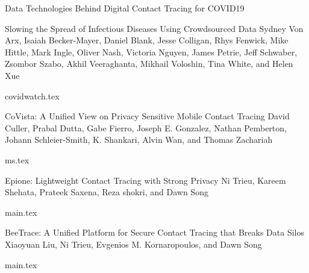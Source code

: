 \documentclass[11pt]{article}
\begin{document}
\begin{bulletin}
\begin{articlesection}{Data Technologies Behind Digital Contact Tracing for COVID19}
\makeatletter
\renewcommand{\AB@affillist}{}
\renewcommand{\AB@authlist}{}
\setcounter{authors}{0}
\makeatother

\begin{article}
{Slowing the Spread of Infectious Diseases Using Crowdsourced Data}
{Sydney Von Arx, Isaiah Becker-Mayer, Daniel Blank, Jesse Colligan, Rhys Fenwick, Mike Hittle, Mark Ingle, Oliver Nash, Victoria Nguyen, James Petrie, Jeff Schwaber, Zsombor Szabo, Akhil Veeraghanta, Mikhail Voloshin, Tina White, and Helen Xue}
\graphicspath{{submissions/covidwatch/}}
{covidwatch.tex}
\end{article}


\makeatletter
\renewcommand{\AB@affillist}{}
\renewcommand{\AB@authlist}{}
\setcounter{authors}{0}
\makeatother

\begin{article}
{CoVista: A Unified View on Privacy Sensitive Mobile Contact Tracing}
{David Culler, Prabal Dutta, Gabe Fierro, Joseph E. Gonzalez, Nathan Pemberton, Johann Schleier-Smith, K. Shankari, Alvin Wan, and Thomas Zachariah}
\graphicspath{{submissions/BerkeleyCovista/figs/}}
{ms.tex}
\end{article}


\makeatletter
\renewcommand{\AB@affillist}{}
\renewcommand{\AB@authlist}{}
\setcounter{authors}{0}
\makeatother

\begin{article}
{Epione: Lightweight  Contact Tracing with Strong Privacy}
{Ni Trieu, Kareem Shehata, Prateek Saxena, Reza shokri, and Dawn Song}
\graphicspath{{submissions/Epione/figs/}}
{main.tex}
\end{article}


\makeatletter
\renewcommand{\AB@affillist}{}
\renewcommand{\AB@authlist}{}
\setcounter{authors}{0}
\makeatother

\begin{article}
{BeeTrace: A Unified Platform for Secure Contact Tracing that Breaks Data Silos}
{Xiaoyuan Liu, Ni Trieu, Evgenios M. Kornaropoulos, and Dawn Song}
\graphicspath{{submissions/BeeTrace/figs/}}
{main.tex}
\end{article}



\end{articlesection}
\end{bulletin}
\end{document}
